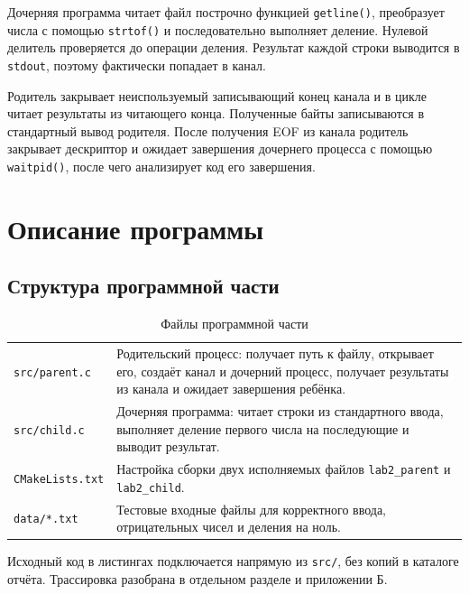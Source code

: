 \documentclass[12pt, a4paper]{article}
\begin{document}
Дочерняя программа читает файл построчно функцией \texttt{getline()}, преобразует
числа с помощью \texttt{strtof()} и последовательно выполняет деление. Нулевой
делитель проверяется до операции деления. Результат каждой строки выводится в
\texttt{stdout}, поэтому фактически попадает в канал.

Родитель закрывает неиспользуемый записывающий конец канала и в цикле читает
результаты из читающего конца. Полученные байты записываются в стандартный вывод
родителя. После получения EOF из канала родитель закрывает дескриптор и ожидает
завершения дочернего процесса с помощью \texttt{waitpid()}, после чего анализирует
код его завершения.

\section{Описание программы}

\subsection{Структура программной части}

\begin{table}[H]
  \caption{Файлы программной части}
  \begin{tabularx}{\linewidth}{|P{4.2cm}|L|}
    \hline
     &  \\ \hline
    \texttt{src/parent.c} & Родительский процесс: получает путь к файлу, открывает его, создаёт канал и дочерний процесс, получает результаты из канала и ожидает завершения ребёнка. \\ \hline
    \texttt{src/child.c} & Дочерняя программа: читает строки из стандартного ввода, выполняет деление первого числа на последующие и выводит результат. \\ \hline
    \texttt{CMakeLists.txt} & Настройка сборки двух исполняемых файлов \texttt{lab2\_parent} и \texttt{lab2\_child}. \\ \hline
    \texttt{data/*.txt} & Тестовые входные файлы для корректного ввода, отрицательных чисел и деления на ноль. \\ \hline
  \end{tabularx}
\end{table}

Исходный код в листингах подключается напрямую из \texttt{src/}, без копий в
каталоге отчёта. Трассировка разобрана в отдельном разделе и приложении Б.
\end{document}
